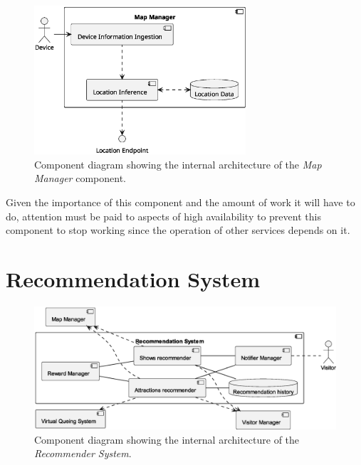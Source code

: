 \begin{figure}[H]
	\centering
	\includegraphics[width=0.7\textwidth]{img/map-manager-overview.eps}
	\caption{Component diagram showing the internal architecture of the \textit{Map Manager} component.}
	\label{fig:map-manager}
\end{figure}

Given the importance of this component and the amount of work it will have to do, attention must be paid to aspects of high availability to prevent
this component to stop working since the operation of other services depends on it.

\section{Recommendation System}

\begin{figure}[H]
	\centering
	\includegraphics[width=\textwidth]{img/recommender.eps}
	\caption{Component diagram showing the internal architecture of the \textit{Recommender System}.
	}
	\label{fig:recommender-arch}
\end{figure}


